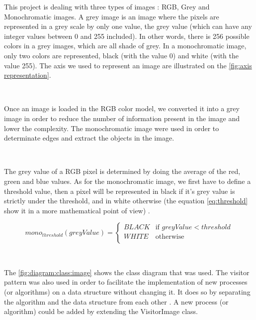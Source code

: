 This project is dealing with three types of images : RGB, Grey and Monochromatic images. A grey image is an image where the pixels are represented in a grey scale by only one value, the grey value (which can have any integer values between 0 and 255 included). In other words, there is 256 possible colors in a grey images, which are all shade of grey. In a monochromatic image, only two colors are represented, black (with the value 0) and white (with the value 255). The axis we used to represent an image are illustrated on the \vref{fig:axis representation}. 

~~

Once an image is loaded in the RGB color model, we converted it into a grey image in order to reduce the number of information present in the image and lower the complexity. The monochromatic image were used in order to determinate edges and extract the objects in the image.

~~

The grey value of a RGB pixel is determined by doing the average of the red, green and blue values. As for the monochromatic image, we first have to define a 
threshold value, then a pixel will be represented in black if it's grey value is strictly under the threshold, and in white otherwise (the equation \ref{eq:threshold} show it in a more mathematical point of view) \cite{bib:image:Threshold}.

\begin{equation} \label{eq:threshold}
mono_{threshold}(greyValue) = 
	\begin{cases}
		BLACK & \text{if } greyValue < threshold \\
		WHITE & \text{otherwise} \\ 
	\end{cases}
\end{equation}


~~

The \vref{fig:diagram:class:image} shows the class diagram that was used. The visitor pattern was also used in order to facilitate the implementation of new processes (or algorithms) on a data structure without changing it. It does so by separating the algorithm and the data structure from each other  \cite{bib:pattern:Visitor}. A new process (or algorithm) could be added by extending the VisitorImage class.


